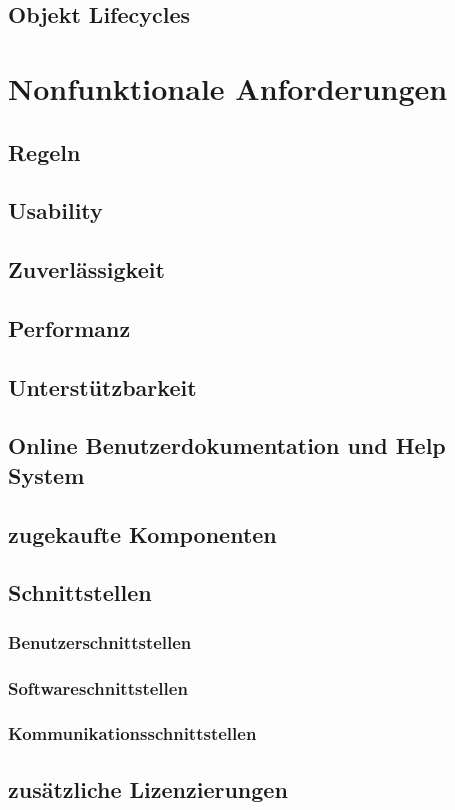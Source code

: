 \documentclass[a4paper,12pt,twoside]{scrreprt}
\begin{document}
    \section{Objekt Lifecycles}

    \chapter{Nonfunktionale Anforderungen  }
    \section{Regeln}
    \section{Usability}
    \section{Zuverlässigkeit}
    \section{Performanz}
    \section{Unterstützbarkeit}
    \section{Online Benutzerdokumentation und Help System}
    \section{zugekaufte Komponenten}
    \section{Schnittstellen}
    \subsection{Benutzerschnittstellen}
    \subsection{Softwareschnittstellen}
    \subsection{Kommunikationsschnittstellen}
    \section{zusätzliche Lizenzierungen}
\end{document}
